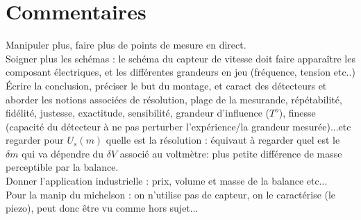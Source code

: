\documentclass[12pt,prb,aps,epsf]{report}
\begin{document}
\section{Commentaires}
Manipuler plus, faire plus de points de mesure en direct.\\ 
Soigner plus les schémas : le schéma du capteur de vitesse doit faire apparaître les composant électriques, et les différentes grandeurs en jeu (fréquence, tension etc..)\\
Écrire la conclusion, préciser le but du montage, et caract des détecteurs et aborder les notions associées de résolution, plage de la mesurande, répétabilité, fidélité, justesse, exactitude, sensibilité, grandeur d'influence ($T^o$), finesse (capacité du détecteur à ne pas perturber l'expérience/la grandeur mesurée)...etc\\
regarder pour $U_s(m)$ quelle est la résolution : équivaut à regarder quel est le $\delta m$ qui va dépendre du $\delta V$ associé au voltmètre: plus petite différence de masse perceptible par la balance.\\
Donner l'application industrielle : prix, volume et masse de la balance etc...\\
Pour la manip du michelson : on n'utilise pas de capteur, on le caractérise (le piezo), peut donc être vu comme hors sujet...
\end{document}
